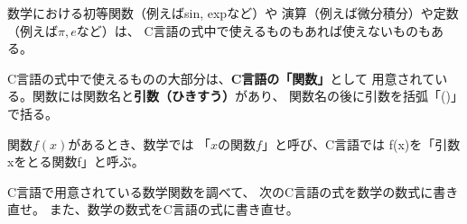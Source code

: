 \documentclass[12pt,a4j]{jarticle}
\newcounter{toi}
\def\toi{%
\bigskip\bigskip\noindent
\addtocounter{toi}{1}
\shadowbox{\bfseries\large 問\thetoi}
\nopagebreak[4]\bigskip\nopagebreak[4]
}
\begin{document}
\toi


数学における初等関数（例えばsin, expなど）や
演算（例えば微分積分）や定数（例えば$\pi, e$など）は、
C言語の式中で使えるものもあれば使えないものもある。

C言語の式中で使えるものの大部分は、{\bfseries C言語の「関数」}として
用意されている。関数には関数名と{\bfseries 引数（ひきすう）}があり、
関数名の後に引数を括弧「{\ttfamily ()}」で括る。

関数$f(x)$があるとき、数学では
「$x$の関数$f$」と呼び、C言語では
{\ttfamily f(x)}を「引数{\ttfamily x}をとる関数{\ttfamily f}」と呼ぶ。



C言語で用意されている数学関数を調べて、
次のC言語の式を数学の数式に書き直せ。
また、数学の数式をC言語の式に書き直せ。
\end{document}
